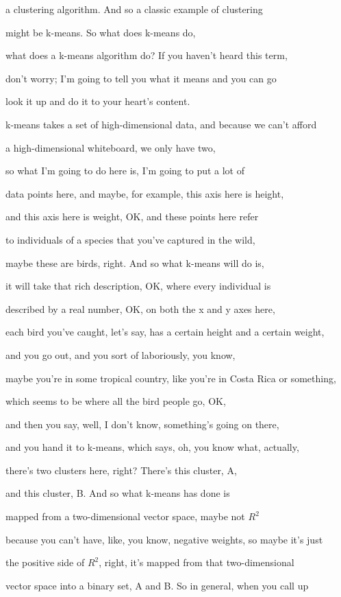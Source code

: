 \documentclass[]{article}
\begin{document}
a clustering algorithm.
And so a classic example of clustering

might be k-means.
So what does k-means do,

what does a k-means algorithm do?
If you haven't heard this term,

don't worry; I'm going to tell you
what it means and you can go

look it up and do it
to your heart's content.

k-means takes a set of high-dimensional
data, and because we can't afford

a high-dimensional whiteboard,
we only have two,

so what I'm going to do here is,
I'm going to put a lot of

data points here, and maybe, for example,
this axis here is height,

and this axis here is weight, OK,
and these points here refer

to individuals of a species
that you've captured in the wild,

maybe these are birds, right.
And so what k-means will do is,

it will take that rich description,
OK, where every individual is

described by a real number, OK,
on both the x and y axes here,

each bird you've caught, let's say,
has a certain height and a certain weight,

and you go out, and you sort of
laboriously, you know,

maybe you're in some tropical country,
like you're in Costa Rica or something,

which seems to be where
all the bird people go, OK,

and then you say, well, I don't know,
something's going on there,

and you hand it to k-means, which says,
oh, you know what, actually,

there's two clusters here, right?
There's this cluster, A,

and this cluster, B. And so
what k-means has done is

mapped from a two-dimensional
vector space, maybe not $R^2$

because you can't have, like, you know,
negative weights, so maybe it's just

the positive side of $R^2$, right,
it's mapped from that two-dimensional

vector space into a binary set, A and B.
So in general, when you call up
\end{document}
